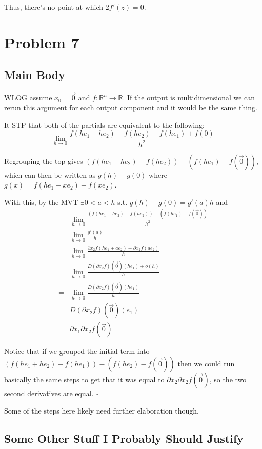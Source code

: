 \documentclass[12pt]{article}
\newcommand{\R}{\mathbb{R}}
\begin{document}
Thus, there's no point at which $2f'(z)=0$.

\pagebreak

\section{Problem 7}

\subsection{Main Body}

WLOG assume $x_0=\vec{0}$ and $f: \R^n \to \R$.
If the output is multidimensional we can rerun this argument
for each output component and it would be the same thing.

It STP that both of the partials are equivalent to the following:
\[\lim_{h \to 0} \frac{f(he_1+he_2)-f(he_2)-f(he_1)+f(0)}{h^2}\]

Regrouping the top gives $(f(he_1+he_2)-f(he_2))-(f(he_1)-f(\vec{0}))$,
which can then be written as $g(h)-g(0)$ where $g(x)=f(he_1+xe_2)-f(xe_2)$.

With this, by the MVT $\exists 0 < a < h$ s.t. $g(h)-g(0)=g'(a)h$ and
\begin{align*}
  & \lim_{h \to 0} \frac{(f(he_1+he_2)-f(he_2))-(f(he_1)-f(\vec{0}))}{h^2} \\
  ={} & \lim_{h \to 0} \frac{g'(a)}{h} \\
  ={} & \lim_{h \to 0} \frac{\partial x_2 f(he_1+ae_2)-\partial x_2 f(ae_2)}{h} \\
  ={} & \lim_{h \to 0} \frac{D(\partial x_2 f)(\vec{0})(he_1)+o(h)}{h} \\
  ={} & \lim_{h \to 0} \frac{D(\partial x_2 f)(\vec{0})(he_1)}{h} \\
  ={} & D(\partial x_2 f)(\vec{0})(e_1) \\
  ={} & \partial x_1 \partial x_2 f(\vec{0})
\end{align*}

Notice that if we grouped the initial term into $(f(he_1+he_2)-f(he_1))-(f(he_2)-f(\vec{0}))$
then we could run basically the same steps to get that it was equal to $\partial x_2 \partial x_2 f(\vec{0})$,
so the two second derivatives are equal. $\square$

Some of the steps here likely need further elaboration though.

\subsection{Some Other Stuff I Probably Should Justify}
\end{document}
